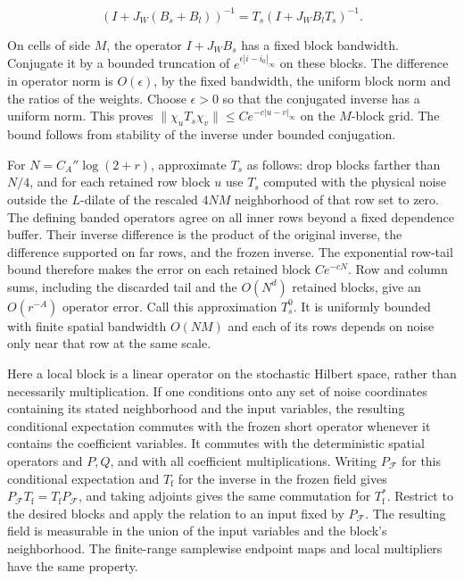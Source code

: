 \documentclass[11pt]{article}
\begin{document}
\begin{equation}\label{eq:short-neumann}
(I+J_W(B_s+B_l))^{-1}=T_s(I+J_W B_l T_s)^{-1}.
\end{equation}

On cells of side \(M\), the operator \(I+J_W B_s\) has a fixed block bandwidth. Conjugate it by a bounded truncation of \(e^{\epsilon |i-i_0|_\infty}\) on these blocks. The difference in operator norm is \(O(\epsilon)\), by the fixed bandwidth, the uniform block norm and the ratios of the weights. Choose \(\epsilon>0\) so that the conjugated inverse has a uniform norm. This proves \(\|\chi_u T_s\chi_v\|\le C e^{-c|u-v|_\infty}\) on the \(M\)-block grid. The bound follows from stability of the inverse under bounded conjugation.

For \(N=C_A''\log(2+r)\), approximate \(T_s\) as follows: drop blocks farther than \(N/4\), and for each retained row block \(u\) use \(T_s\) computed with the physical noise outside the \(L\)-dilate of the rescaled \(4NM\) neighborhood of that row set to zero. The defining banded operators agree on all inner rows beyond a fixed dependence buffer. Their inverse difference is the product of the original inverse, the difference supported on far rows, and the frozen inverse. The exponential row-tail bound therefore makes the error on each retained block \(C e^{-cN}\). Row and column sums, including the discarded tail and the \(O(N^d)\) retained blocks, give an \(O(r^{-A})\) operator error. Call this approximation \(T_s^0\). It is uniformly bounded with finite spatial bandwidth \(O(NM)\) and each of its rows depends on noise only near that row at the same scale.

Here a local block is a linear operator on the stochastic Hilbert space, rather than necessarily multiplication. If one conditions onto any set of noise coordinates containing its stated neighborhood and the input variables, the resulting conditional expectation commutes with the frozen short operator whenever it contains the coefficient variables. It commutes with the deterministic spatial operators and \(P,Q\), and with all coefficient multiplications. Writing \(P_{\mathcal F}\) for this conditional expectation and \(T_{\mathrm f}\) for the inverse in the frozen field gives \(P_{\mathcal F}T_{\mathrm f}=T_{\mathrm f}P_{\mathcal F}\), and taking adjoints gives the same commutation for \(T_{\mathrm f}^*\). Restrict to the desired blocks and apply the relation to an input fixed by \(P_{\mathcal F}\). The resulting field is measurable in the union of the input variables and the block's neighborhood. The finite-range samplewise endpoint maps and local multipliers have the same property.
\end{document}
